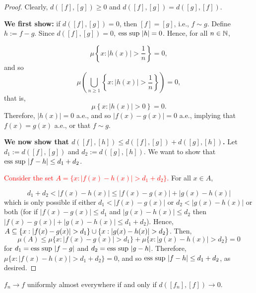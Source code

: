 \begin{proof}
    Clearly, $d([f], [g]) \geq 0$ and $d([f], [g]) = d([g], [f])$. 

    \textbf{We first show:} if $d([f], [g]) = 0$, then $[f] = [g]$, i.e., $f \sim g$. Define $h := f - g$. Since $d([f], [g]) = 0$, $ \text{ess sup } |h| = 0$. Hence, for all $n \in \mathbb{N}$, 

    $$ \mu \left\{ x : |h(x)| > \frac{1}{n} \right\} = 0 ,$$
    and so
    $$ \mu \left( \bigcup_{n \geq 1} \left\{ x : |h(x)| > \frac{1}{n} \right\} \right) = 0,$$
    that is, 
    $$ \mu \left\{ x : |h(x)| > 0 \right\} = 0. $$
    Therefore, $|h(x)| = 0$ a.e., and so $|f(x) - g(x)| = 0$ a.e., implying that $f(x) = g(x)$ a.e., or that $f \sim g$. 

    \textbf{We now show that $d([f], [h]) \leq d([f], [g]) + d([g], [h])$.} Let $d_1 := d([f], [g])$ and $d_2 := d([g], [h])$. We want to show that $\text{ess sup } |f - h| \leq d_1 + d_2$. 
    
    \textcolor{red}{Consider the set $A = \{ x: |f(x) - h(x)| > d_1 + d_2 \}$.} For all $x \in A$, 

    $$ d_1 + d_2 < |f(x) - h(x)| \leq |f(x) - g(x)| + |g(x) - h(x)| $$
    which is only possible if either $d_1 < |f(x) - g(x)|$ or $d_2 < |g(x) - h(x)|$ or both (for if $|f(x) - g(x)| \leq d_1$ and $|g(x) - h(x)| \leq d_2$ then $|f(x) - g(x)| + |g(x) - h(x)| \leq d_1 + d_2$). Hence, $A \subseteq \{ x : |f(x) - g(x)| > d_1 \} \cup \{ x : |g(x) - h(x)| > d_2 \}$. Then, 
    $$\mu(A) \leq \mu\{ x : |f(x) - g(x)| > d_1 \} + \mu\{ x : |g(x) - h(x)| > d_2 \} = 0$$
    for $d_1 = \text{ess sup } |f - g|$ and $d_2 = \text{ess sup } |g - h|$. Therefore, $\mu\{ x: |f(x) - h(x)| > d_1 + d_2 \} = 0$, and so $\text{ess sup } |f - h| \leq d_1 + d_2$, as desired.
\end{proof}

\begin{theorem}
    $f_n \to f$ uniformly almost everywhere if and only if $d([f_n], [f]) \to 0$. 
\end{theorem}

